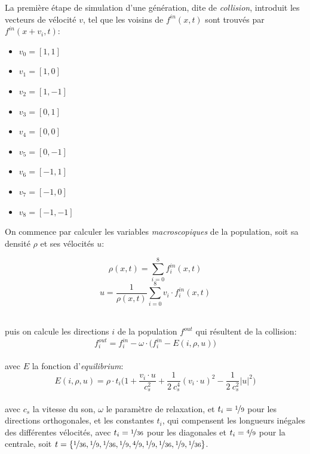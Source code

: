 La première étape de simulation d'une génération, dite de \textit{collision}, introduit les vecteurs de vélocité $v$,  tel que les voisins de $f^{in}(x, t)$ sont trouvés par $f^{in}(x+v_i,t)$: 
\begin{multicols}{3}
\begin{itemize}
\item[] $v_0 = [1,1]$
\item[] $v_1 = [1,0]$
\item[] $v_2 = [1,-1]$
\item[] $v_3 = [0,1]$
\item[] $v_4 = [0,0]$
\item[] $v_5 = [0,-1]$
\item[] $v_6 = [-1,1]$
\item[] $v_7 = [-1,0]$
\item[] $v_8 = [-1,-1]$
\end{itemize}
\end{multicols}

On commence par calculer les variables \textit{macroscopiques} de la population, soit sa densité $\rho$ et ses vélocités $u$:\\[-2\baselineskip]
\begin{multicols}{2}
\begin{equation}
\rho(x, t) = \sum_{i=0}^{8} f^{in}_i(x,t)
\end{equation}
\begin{equation}
u = \frac{1}{\rho(x,t)}\sum_{i=0}^{8} v_i \cdot f^{in}_i(x,t)
\end{equation}
\end{multicols}~\\[-0.5\baselineskip]
\noindent puis on calcule les directions $i$ de la population $f^{out}$ qui résultent de la collision:
\begin{equation}
f^{out}_i = f^{in}_i - \omega \cdot \big(f^{in}_i - E(i, \rho, u) \big)
\end{equation}\\[-\baselineskip]

\noindent avec $E$ la fonction d'\textit{equilibrium}:
\begin{equation}
E(i, \rho, u) = \rho\cdot t_i \bigg(  1 + \frac{v_i \cdot u}{c^2_s} + \frac{1}{2~c^4_s} (v_i \cdot u)^2 - \frac{1}{2~c^2_s} |u|^2 \bigg)
\end{equation}\\[-\baselineskip]

\noindent avec $c_s$ la vitesse du son, $\omega$ le paramètre de relaxation, et $t_i = \nicefrac{1}{9}$ pour les directions orthogonales, et les constantes $t_i$, qui compensent les longueurs inégales des différentes vélocités, avec $t_i =\nicefrac{1}{36}$ pour les diagonales et $t_i=\nicefrac{4}{9}$ pour la centrale, soit $t = \{\nicefrac{1}{36} , \nicefrac{1}{9}, \nicefrac{1}{36}, \nicefrac{1}{9}, \nicefrac{4}{9}, \nicefrac{1}{9}, \nicefrac{1}{36}, \nicefrac{1}{9}, \nicefrac{1}{36}\}$.

